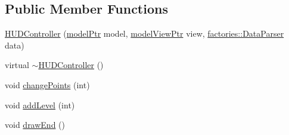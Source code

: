 \subsection*{\-Public \-Member \-Functions}
\begin{DoxyCompactItemize}
\item 
\hyperlink{classcontrollers_1_1HUDController_a11f2b4e58352a991e5e30301295016ac}{\-H\-U\-D\-Controller} (\hyperlink{ModelView_8h_a78966ddb517fca8d2b29a2bc5c31e74e}{model\-Ptr} model, \hyperlink{Controller_8h_a8ca0a41a38eb52be242997413482c0cf}{model\-View\-Ptr} view, \hyperlink{classfactories_1_1DataParser}{factories\-::\-Data\-Parser} data)
\item 
virtual \hyperlink{classcontrollers_1_1HUDController_a3f18d26dfe823f716ce486ceae787289}{$\sim$\-H\-U\-D\-Controller} ()
\item 
void \hyperlink{classcontrollers_1_1HUDController_acf54bb15a446bf808e97212396144065}{change\-Points} (int)
\item 
void \hyperlink{classcontrollers_1_1HUDController_af07de6b217754b32c64eaa60060beb31}{add\-Level} (int)
\item 
void \hyperlink{classcontrollers_1_1HUDController_a7b92fa8879d37323e32d8ba96c972c85}{draw\-End} ()
\end{DoxyCompactItemize}


